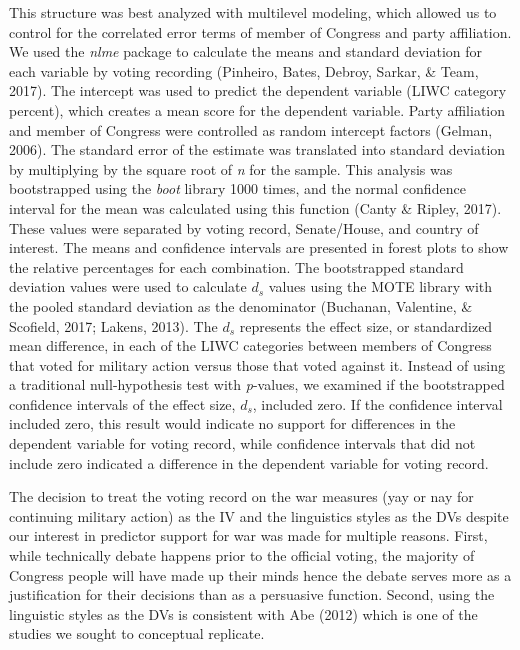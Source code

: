 \documentclass[jou,a4paper]{apa6}
\begin{document}
This structure was best analyzed with multilevel modeling, which allowed us to control for the correlated error terms of member of Congress and party affiliation. We used the \emph{nlme} package to calculate the means and standard deviation for each variable by voting recording (Pinheiro, Bates, Debroy, Sarkar, \& Team, 2017). The intercept was used to predict the dependent variable (LIWC category percent), which creates a mean score for the dependent variable. Party affiliation and member of Congress were controlled as random intercept factors (Gelman, 2006). The standard error of the estimate was translated into standard deviation by multiplying by the square root of \emph{n} for the sample. This analysis was bootstrapped using the \emph{boot} library 1000 times, and the normal confidence interval for the mean was calculated using this function (Canty \& Ripley, 2017). These values were separated by voting record, Senate/House, and country of interest. The means and confidence intervals are presented in forest plots to show the relative percentages for each combination. The bootstrapped standard deviation values were used to calculate \(d_s\) values using the MOTE library with the pooled standard deviation as the denominator (Buchanan, Valentine, \& Scofield, 2017; Lakens, 2013). The \(d_s\) represents the effect size, or standardized mean difference, in each of the LIWC categories between members of Congress that voted for military action versus those that voted against it. Instead of using a traditional null-hypothesis test with \emph{p}-values, we examined if the bootstrapped confidence intervals of the effect size, \(d_s\), included zero. If the confidence interval included zero, this result would indicate no support for differences in the dependent variable for voting record, while confidence intervals that did not include zero indicated a difference in the dependent variable for voting record.

The decision to treat the voting record on the war measures (yay or nay for continuing military action) as the IV and the linguistics styles as the DVs despite our interest in predictor support for war was made for multiple reasons. First, while technically debate happens prior to the official voting, the majority of Congress people will have made up their minds hence the debate serves more as a justification for their decisions than as a persuasive function. Second, using the linguistic styles as the DVs is consistent with Abe (2012) which is one of the studies we sought to conceptual replicate.
\end{document}
